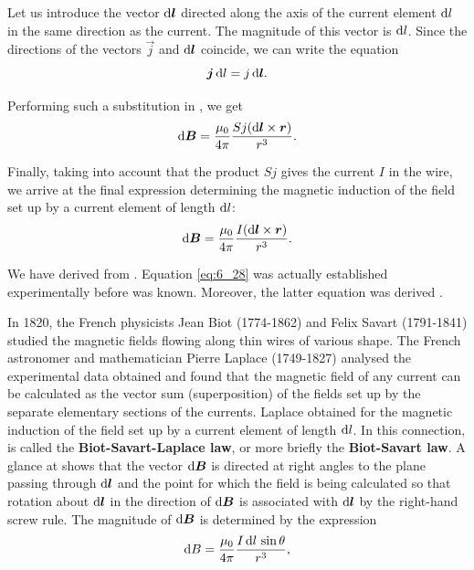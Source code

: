 Let us introduce the vector $\mathrm{d}\boldsymbol{l}$ directed along the axis of the current element $\mathrm{d} l$ in the same direction as the current. The magnitude of this vector is $\mathrm{d} l$. Since the directions of the vectors $\vec{j}$ and $\mathrm{d}\boldsymbol{l}$ coincide, we can write the equation
\begin{equation}\label{eq:6_27}
    \boldsymbol{j}\, \mathrm{d} l = j\, \mathrm{d}\boldsymbol{l}.
\end{equation}

\noindent
Performing such a substitution in , we get
\begin{equation*}
    \mathrm{d}\boldsymbol{B} = \frac{\mu_0}{4\pi} \frac{S j (\mathrm{d}\boldsymbol{l}\times\boldsymbol{r})}{r^3}.
\end{equation*}

\noindent
Finally, taking into account that the product $Sj$ gives the current $I$ in the wire, we arrive at the final expression determining the magnetic induction of the field set up by a current element of length $\mathrm{d} l$:
\begin{equation}\label{eq:6_28}
    \mathrm{d}\boldsymbol{B} = \frac{\mu_0}{4\pi} \frac{I (\mathrm{d}\boldsymbol{l}\times\boldsymbol{r})}{r^3}.
\end{equation}

We have derived  from . Equation \eqref{eq:6_28} was actually established experimentally before  was known. Moreover, the latter equation was derived .

In 1820, the French physicists Jean Biot (1774-1862) and Felix Savart (1791-1841) studied the magnetic fields flowing along thin wires of various shape. The French astronomer and mathematician Pierre Laplace (1749-1827) analysed the experimental data obtained and found that the magnetic field of any current can be calculated as the vector sum (superposition) of the fields set up by the separate elementary sections of the currents. Laplace obtained  for the magnetic induction of the field set up by a current element of length $\mathrm{d} l$. In this connection,  is called the \textbf{Biot-Savart-Laplace law}, or more briefly the \textbf{Biot-Savart law}. A glance at  shows that the vector $\mathrm{d}\boldsymbol{B}$ is directed at right angles to the plane passing through $\mathrm{d}\boldsymbol{l}$ and the point for which the field is being calculated so that rotation about $\mathrm{d}\boldsymbol{l}$ in the direction of $\mathrm{d}\boldsymbol{B}$ is associated with $\mathrm{d}\boldsymbol{l}$ by the right-hand screw rule.
The magnitude of $\mathrm{d}\boldsymbol{B}$ is determined by the expression
\begin{equation}\label{eq:6_29}
    \mathrm{d} B = \frac{\mu_0}{4\pi} \frac{I\, \mathrm{d} l\, \sin\theta}{r^3},
\end{equation}

